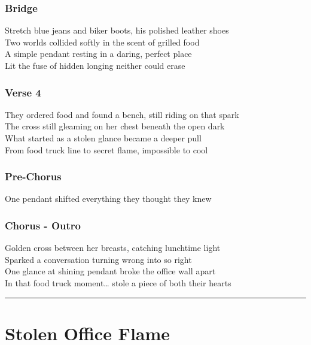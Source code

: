 \subsubsection{Bridge}\label{bridge-30}

Stretch blue jeans and biker boots, his polished leather shoes\\
Two worlds collided softly in the scent of grilled food\\
A simple pendant resting in a daring, perfect place\\
Lit the fuse of hidden longing neither could erase

\subsubsection{Verse 4}\label{verse-4-11}

They ordered food and found a bench, still riding on that spark\\
The cross still gleaming on her chest beneath the open dark\\
What started as a stolen glance became a deeper pull\\
From food truck line to secret flame, impossible to cool

\subsubsection{Pre-Chorus}\label{pre-chorus-63}

One pendant shifted everything they thought they knew

\subsubsection{Chorus - Outro}\label{chorus---outro-7}

Golden cross between her breasts, catching lunchtime light\\
Sparked a conversation turning wrong into so right\\
One glance at shining pendant broke the office wall apart\\
In that food truck moment\ldots{} stole a piece of both their hearts

\begin{center}\rule{0.5\linewidth}{0.5pt}\end{center}

\section{Stolen Office Flame}\label{stolen-office-flame}

